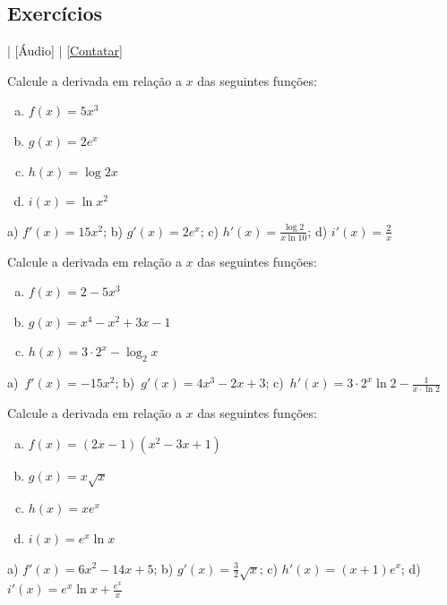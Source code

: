 \subsection*{Exercícios}

\begin{flushright}
  [Vídeo] | [Áudio] | \href{https://phkonzen.github.io/notas/contato.html}{[Contatar]}
\end{flushright}

\begin{exer}
  Calcule a derivada em relação a $x$ das seguintes funções:
  \begin{enumerate}[a)]
  \item $\displaystyle f(x) = 5x^3$
  \item $\displaystyle g(x) = 2e^x$
  \item $\displaystyle h(x) = \log 2x$
  \item $\displaystyle i(x) = \ln x^2$
  \end{enumerate}
\end{exer}
\begin{resp}
  a) $\displaystyle f'(x) = 15x^2$; b) $\displaystyle g'(x) = 2e^x$; c) $\displaystyle h'(x) = \frac{\log 2}{x\ln 10}$; d) $\displaystyle i'(x) = \frac{2}{x}$
\end{resp}

\begin{exer}
  Calcule a derivada em relação a $x$ das seguintes funções:
  \begin{enumerate}[a)]
  \item $\displaystyle f(x) = 2 - 5x^3$ \\
  \item $\displaystyle g(x) = x^4 - x^2 + 3x - 1$
  \item $\displaystyle h(x) = 3\cdot 2^x - \log_2 x$
  \end{enumerate}
\end{exer}
\begin{resp}
  a)~$\displaystyle f'(x) = -15x^2$; b)~$\displaystyle g'(x)= 4x^3 - 2x + 3$; c)~$\displaystyle h'(x) = 3\cdot 2^x\ln 2 - \frac{1}{x\cdot \ln 2}$
\end{resp}

\begin{exer}
  Calcule a derivada em relação a $x$ das seguintes funções:
  \begin{enumerate}[a)]
  \item $\displaystyle f(x) = (2x - 1)(x^2 - 3x + 1)$
  \item $\displaystyle g(x) = x\sqrt{x}$
  \item $\displaystyle h(x) = xe^x$
  \item $\displaystyle i(x) = e^x\ln x$
  \end{enumerate}
\end{exer}
\begin{resp}
  a) $\displaystyle f'(x) = 6x^2 - 14x + 5$; b) $\displaystyle g'(x) = \frac{3}{2}\sqrt{x}$; c) $\displaystyle h'(x) = (x+1)e^x$; d) $\displaystyle i'(x) = e^x\ln x + \frac{e^x}{x}$
\end{resp}

